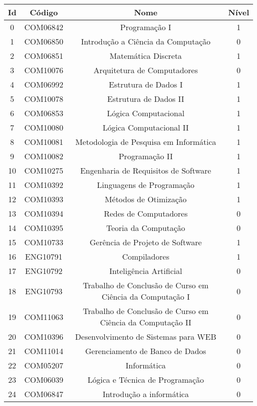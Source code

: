 \begin{apendices}
{\footnotesize
\begin{longtable}{|c|c|c|c|}
\hline
\textbf{Id} & \textbf{Código} & \textbf{Nome} & \textbf{Nível} \\ \hline
0 & COM06842 & Programação I & 1 \\ \hline
1 & COM06850 & Introdução a Ciência da Computação & 0 \\ \hline
2 & COM06851 & Matemática Discreta & 1 \\ \hline
3 & COM10076 & Arquitetura de Computadores & 0 \\ \hline
4 & COM06992 & Estrutura de Dados I & 1 \\ \hline
5 & COM10078 & Estrutura de Dados II & 1 \\ \hline
6 & COM06853 & Lógica Computacional & 1 \\ \hline
7 & COM10080 & Lógica Computacional II & 1 \\ \hline
8 & COM10081 & Metodologia de Pesquisa em Informática & 1 \\ \hline
9 & COM10082 & Programação II & 1 \\ \hline
10 & COM10275 & Engenharia de Requisitos de Software & 1 \\ \hline
11 & COM10392 & Linguagens de Programação & 1 \\ \hline
12 & COM10393 & Métodos de Otimização & 1 \\ \hline
13 & COM10394 & Redes de Computadores & 0 \\ \hline
14 & COM10395 & Teoria da Computação & 0 \\ \hline
15 & COM10733 & Gerência de Projeto de Software & 1 \\ \hline
16 & ENG10791 & Compiladores & 1 \\ \hline
17 & ENG10792 & Inteligência Artificial & 0 \\ \hline
18 & ENG10793 & Trabalho de Conclusão de Curso em Ciência da Computação I & 0 \\ \hline
19 & COM11063 & Trabalho de Conclusão de Curso em Ciência da Computação II & 0 \\ \hline
20 & COM10396 & Desenvolvimento de Sistemas para WEB & 0 \\ \hline
21 & COM11014 & Gerenciamento de Banco de Dados & 0 \\ \hline
22 & COM05207 & Informática & 0 \\ \hline
23 & COM06039 & Lógica e Técnica de Programação & 0 \\ \hline
24 & COM06847 & Introdução a informática & 0 \\ \hline

\end{longtable}}
\end{apendices}
